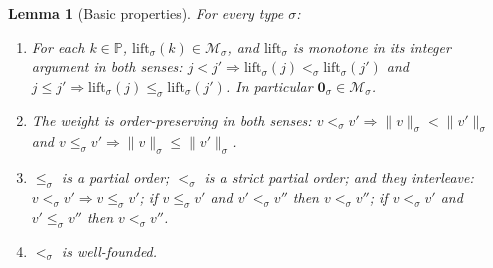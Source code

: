 \documentclass{amsart}
\newtheorem{lemma}{Lemma}
\theoremstyle{definition}
\begin{document}
\begin{lemma}[Basic properties]\label{lem:basic}
For every type $\sigma$:
\begin{enumerate}
\item[(a)] For each $k\in\mathbb P$, $\mathrm{lift}_\sigma(k)\in\mathcal M_\sigma$, and
  $\mathrm{lift}_\sigma$ is monotone in its integer argument in both senses:
  $j<j'\Rightarrow\mathrm{lift}_\sigma(j)<_\sigma\mathrm{lift}_\sigma(j')$ and
  $j\le j'\Rightarrow\mathrm{lift}_\sigma(j)\le_\sigma\mathrm{lift}_\sigma(j')$.
  In particular $\mathbf 0_\sigma\in\mathcal M_\sigma$.
\item[(b)] The weight is order-preserving in both senses:
  $v<_\sigma v'\Rightarrow\|v\|_\sigma<\|v'\|_\sigma$ and
  $v\le_\sigma v'\Rightarrow\|v\|_\sigma\le\|v'\|_\sigma$.
\item[(c)] $\le_\sigma$ is a partial order; $<_\sigma$ is a strict partial order; and they
  interleave: $v<_\sigma v'\Rightarrow v\le_\sigma v'$; if $v\le_\sigma v'$ and
  $v'<_\sigma v''$ then $v<_\sigma v''$; if $v<_\sigma v'$ and $v'\le_\sigma v''$ then
  $v<_\sigma v''$.
\item[(d)] $<_\sigma$ is well-founded.
\end{enumerate}
\end{lemma}
\end{document}
